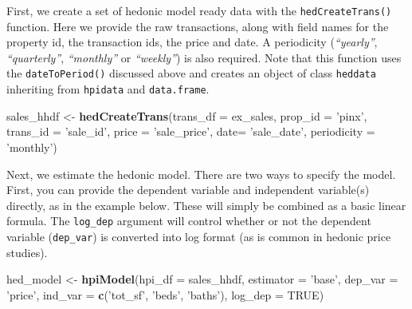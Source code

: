 \documentclass[]{article}
\newenvironment{Shaded}{\begin{snugshade}}{\end{snugshade}}
\newcommand{\DataTypeTok}[1]{\textcolor[rgb]{0.13,0.29,0.53}{#1}}
\newcommand{\KeywordTok}[1]{\textcolor[rgb]{0.13,0.29,0.53}{\textbf{#1}}}
\newcommand{\NormalTok}[1]{#1}
\newcommand{\OtherTok}[1]{\textcolor[rgb]{0.56,0.35,0.01}{#1}}
\newcommand{\StringTok}[1]{\textcolor[rgb]{0.31,0.60,0.02}{#1}}
\begin{document}
First, we create a set of hedonic model ready data with the
\texttt{hedCreateTrans()} function. Here we provide the raw
transactions, along with field names for the property id, the
transaction ids, the price and date. A periodicity (\emph{``yearly''},
\emph{``quarterly''}, \emph{``monthly''} or \emph{``weekly''}) is also
required. Note that this function uses the \texttt{dateToPeriod()}
discussed above and creates an object of class \texttt{heddata}
inheriting from \texttt{hpidata} and \texttt{data.frame}.

\begin{Shaded}
\begin{Highlighting}[]
\NormalTok{  sales_hhdf <-}\StringTok{ }\KeywordTok{hedCreateTrans}\NormalTok{(}\DataTypeTok{trans_df =}\NormalTok{ ex_sales,}
                               \DataTypeTok{prop_id =} \StringTok{'pinx'}\NormalTok{,}
                               \DataTypeTok{trans_id =} \StringTok{'sale_id'}\NormalTok{,}
                               \DataTypeTok{price =} \StringTok{'sale_price'}\NormalTok{,}
                               \DataTypeTok{date=} \StringTok{'sale_date'}\NormalTok{,}
                               \DataTypeTok{periodicity =} \StringTok{'monthly'}\NormalTok{)}
\end{Highlighting}
\end{Shaded}

Next, we estimate the hedonic model. There are two ways to specify the
model. First, you can provide the dependent variable and independent
variable(s) directly, as in the example below. These will simply be
combined as a basic linear formula. The \texttt{log\_dep} argument will
control whether or not the dependent variable (\texttt{dep\_var}) is
converted into log format (as is common in hedonic price studies).

\begin{Shaded}
\begin{Highlighting}[]
\NormalTok{  hed_model <-}\StringTok{ }\KeywordTok{hpiModel}\NormalTok{(}\DataTypeTok{hpi_df =}\NormalTok{ sales_hhdf,}
                        \DataTypeTok{estimator =} \StringTok{'base'}\NormalTok{,}
                        \DataTypeTok{dep_var =} \StringTok{'price'}\NormalTok{,}
                        \DataTypeTok{ind_var =} \KeywordTok{c}\NormalTok{(}\StringTok{'tot_sf'}\NormalTok{, }\StringTok{'beds'}\NormalTok{, }\StringTok{'baths'}\NormalTok{),}
                        \DataTypeTok{log_dep =} \OtherTok{TRUE}\NormalTok{)}
\end{Highlighting}
\end{Shaded}
\end{document}
